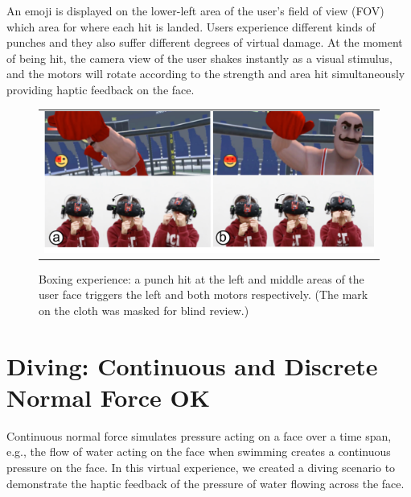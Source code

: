 An emoji is displayed on the lower-left area of the user's field of view (FOV) which area for where each hit is landed. Users experience different kinds of punches and they also suffer different degrees of virtual damage. At the moment of being hit, the camera view of the user shakes instantly as a visual stimulus, and the motors will rotate according to the strength and area hit simultaneously providing haptic feedback on the face.

\begin{figure}[h]
    \begin{center}
        \begin{tabular}{@{\hspace{0.1cm}}c}
            \includegraphics[width=1\linewidth]{figures/boxing2}
        \end{tabular}
        \caption{Boxing experience: a punch hit at the left and middle areas of the user face triggers the left and both motors respectively. (The mark on the cloth was masked for blind review.)}
        \label{fig:boxing}
    \end{center}
\end{figure}

\section{Diving: Continuous and Discrete Normal Force OK}

Continuous normal force simulates pressure acting on a face over a time span, e.g., the flow of water acting on the face when swimming creates a continuous pressure on the face. In this virtual experience, we created a diving scenario to demonstrate the haptic feedback of the pressure of water flowing across the face. 

